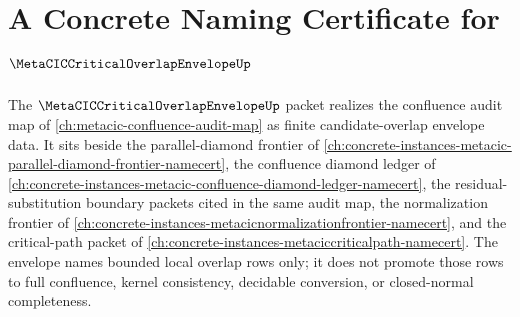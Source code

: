 \chapter{A Concrete Naming Certificate for $\MetaCICCriticalOverlapEnvelopeUp$}
\label{ch:concrete-instances-metacic-critical-overlap-envelope-namecert}

The $\MetaCICCriticalOverlapEnvelopeUp$ packet realizes the confluence audit map of \autoref{ch:metacic-confluence-audit-map} as finite candidate-overlap envelope data. It sits beside the parallel-diamond frontier of \autoref{ch:concrete-instances-metacic-parallel-diamond-frontier-namecert}, the confluence diamond ledger of \autoref{ch:concrete-instances-metacic-confluence-diamond-ledger-namecert}, the residual-substitution boundary packets cited in the same audit map, the normalization frontier of \autoref{ch:concrete-instances-metacicnormalizationfrontier-namecert}, and the critical-path packet of \autoref{ch:concrete-instances-metaciccriticalpath-namecert}. The envelope names bounded local overlap rows only; it does not promote those rows to full confluence, kernel consistency, decidable conversion, or closed-normal completeness.

